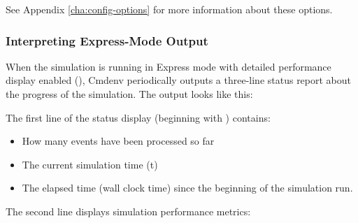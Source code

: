 See Appendix \ref{cha:config-options} for more information about these options.

\subsubsection{Interpreting Express-Mode Output}
\label{sec:run-sim:cmdenv:express-mode:output}

When the simulation is running in Express mode with detailed
performance display enabled (), Cmdenv
periodically outputs a three-line status report about the progress of the simulation.
The output looks like this:


The first line of the status display (beginning with \ttt{**})
contains:

\begin{itemize}
   \item How many events have been processed so far
   \item The current simulation time (t)
   \item The elapsed time (wall clock time) since the beginning of the simulation run.
\end{itemize}

The second line displays simulation performance metrics:

